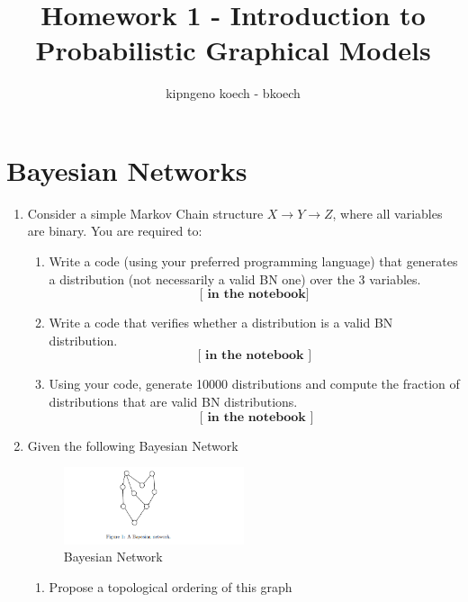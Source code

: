 \documentclass[a3paper,12pt]{extarticle} %
\begin{document}
\author{kipngeno koech - bkoech}
\title{Homework 1 - Introduction to Probabilistic Graphical Models}   
\maketitle

\medskip

\maketitle

\section{Bayesian Networks}

\begin{enumerate}
\item Consider a simple Markov Chain structure \( X \rightarrow Y \rightarrow Z \), where all variables are binary. You are required to:
\begin{enumerate}
    \item Write a code (using your preferred programming language) that generates a distribution (not necessarily a valid BN one) over the 3 variables.
        \[\textbf{[ in the notebook]}\]
    \item Write a code that verifies whether a distribution is a valid BN distribution.
        \[\textbf{[ in the notebook ]}\]
    \item Using your code, generate 10000 distributions and compute the fraction of distributions that are valid BN distributions.
        \[\textbf{ [ in the notebook ]}\]
\end{enumerate}
\item Given the following Bayesian Network
\begin{figure}[h]
    \centering
    \includegraphics[width=0.5\textwidth]{bn.png}
    \caption{Bayesian Network}
\end{figure}
\begin{enumerate}
    \item Propose a topological ordering of this graph
    \begin{figure}[h]
        \centering

\end{figure}
\end{enumerate}
\end{enumerate}
\end{document}
